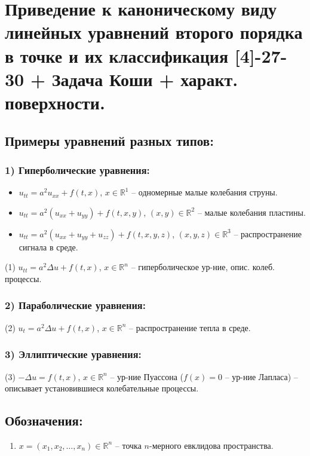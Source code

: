 \documentclass[12pt, a4paper]{article}
\begin{document}
\newpage
\section*{Приведение к каноническому виду линейных уравнений второго порядка в точке и их классификация [4]-27-30 + Задача Коши + характ. поверхности.}

\subsection*{Примеры уравнений разных типов:}

\subsubsection*{1) Гиперболические уравнения:}
\begin{itemize}
    \item $u_{tt} = a^2 u_{xx} + f(t,x)$, $x \in \mathbb{R}^1$ -- одномерные малые колебания струны.
    \item $u_{tt} = a^2 (u_{xx} + u_{yy}) + f(t,x,y)$, $(x,y) \in \mathbb{R}^2$ -- малые колебания пластины.
    \item $u_{tt} = a^2 (u_{xx} + u_{yy} + u_{zz}) + f(t,x,y,z)$, $(x,y,z) \in \mathbb{R}^3$ -- распространение сигнала в среде.
\end{itemize}
(1) $u_{tt} = a^2 \Delta u + f(t,x)$, $x \in \mathbb{R}^n$ -- гиперболическое ур-ние, опис. колеб. процессы.

\subsubsection*{2) Параболические уравнения:}
(2) $u_t = a^2 \Delta u + f(t,x)$, $x \in \mathbb{R}^n$ -- распространение тепла в среде.

\subsubsection*{3) Эллиптические уравнения:}
(3) $-\Delta u = f(t,x)$, $x \in \mathbb{R}^n$ -- ур-ние Пуассона ($f(x)=0$ -- ур-ние Лапласа) -- описывает установившиеся колебательные процессы.

\subsection*{Обозначения:}
\begin{enumerate}
    \item $x = (x_1, x_2, \dots, x_n) \in \mathbb{R}^n$ -- точка $n$-мерного евклидова пространства.
\end{enumerate}
\end{document}
